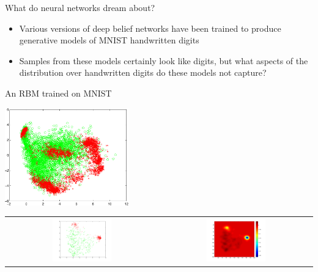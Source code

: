 \begin{frame}{What do neural networks dream about?}
  \begin{itemize}
    \item Various versions of deep belief networks have been trained to produce generative models of MNIST handwritten digits
    \vspace{\baselineskip}
    \pause
    \item Samples from these models certainly look like digits, but what aspects of the distribution over handwritten digits do these models not capture?
  \end{itemize}
\end{frame}

\begin{frame}{An RBM trained on MNIST}
  \begin{center}
  \includegraphics[width=0.4\textwidth]{figures/rbm_pca}
  \end{center}
  \pause
  \begin{center}
  \begin{tabular}{cc}
    \includegraphics[width=0.4\textwidth]{figures/rbm_0_pca} & 
    \pause
    \includegraphics[width=0.4\textwidth]{figures/rbm_0_witness}
  \end{tabular}
  \end{center}
\end{frame}

